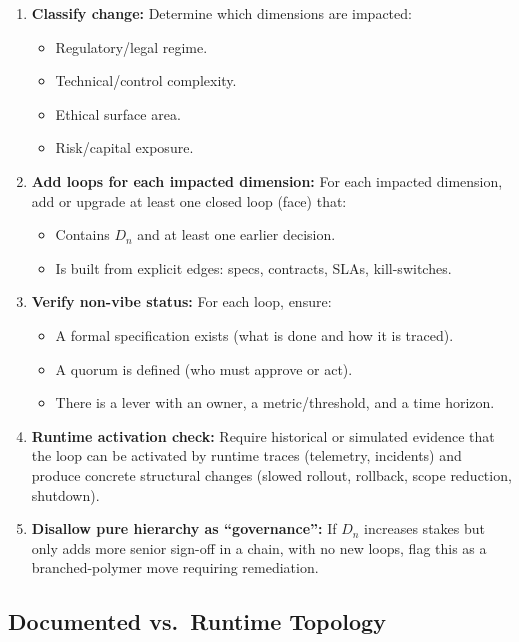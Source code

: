 \documentclass[11pt]{article}
\begin{document}
\begin{enumerate}
  \item \textbf{Classify change:} Determine which dimensions are impacted:
  \begin{itemize}
    \item Regulatory/legal regime.
    \item Technical/control complexity.
    \item Ethical surface area.
    \item Risk/capital exposure.
  \end{itemize}

  \item \textbf{Add loops for each impacted dimension:} For each impacted dimension, add or upgrade at least one closed loop (face) that:
  \begin{itemize}
    \item Contains \(D_n\) and at least one earlier decision.
    \item Is built from explicit edges: specs, contracts, SLAs, kill-switches.
  \end{itemize}

  \item \textbf{Verify non-vibe status:} For each loop, ensure:
  \begin{itemize}
    \item A formal specification exists (what is done and how it is traced).
    \item A quorum is defined (who must approve or act).
    \item There is a lever with an owner, a metric/threshold, and a time horizon.
  \end{itemize}

  \item \textbf{Runtime activation check:} Require historical or simulated evidence that the loop can be activated by runtime traces (telemetry, incidents) and produce concrete structural changes (slowed rollout, rollback, scope reduction, shutdown).

  \item \textbf{Disallow pure hierarchy as ``governance'':} If \(D_n\) increases stakes but only adds more senior sign-off in a chain, with no new loops, flag this as a branched-polymer move requiring remediation.
\end{enumerate}

\subsection{Documented vs.\ Runtime Topology}
\end{document}

